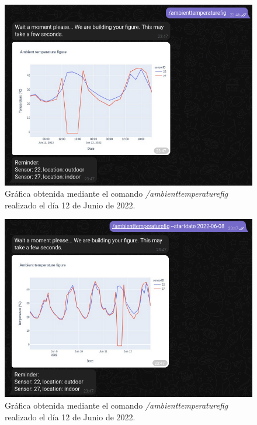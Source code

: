 \documentclass[a4paper, 12pt, oneside]{book}
\begin{document}
\begin{figure}[H]
	\centering
    \includegraphics[width=12cm, keepaspectratio]{img/ambienttemperaturefig}
    \caption{Gráfica obtenida mediante el comando \textit{/ambienttemperaturefig} realizado el día 12 de Junio de 2022.}
    \label{figura:ambienttemperaturefig}
\end{figure}

\begin{figure}[H]
	\centering
    \includegraphics[width=12cm, keepaspectratio]{img/ambienttemperaturefig_startdate}
    \caption{Gráfica obtenida mediante el comando \textit{/ambienttemperaturefig} realizado el día 12 de Junio de 2022.}
    \label{figura:ambienttemperaturefig_startdate}
\end{figure}
\end{document}
